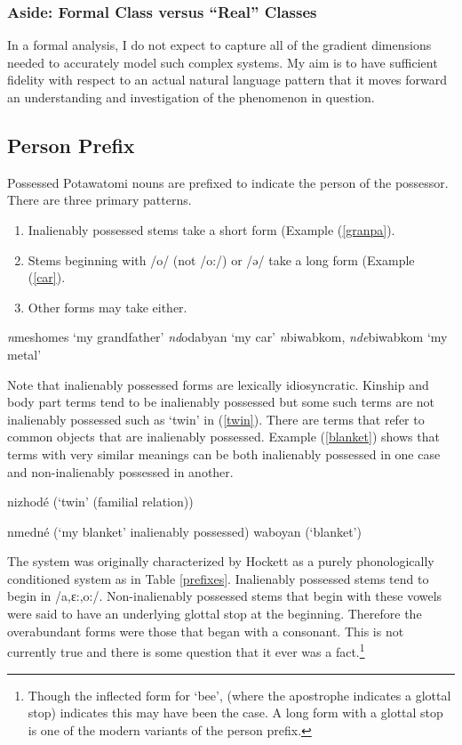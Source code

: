 \subsubsection{Aside: Formal Class versus ``Real'' Classes}

In a formal analysis, I do not expect to capture all of the gradient
dimensions needed to accurately model such complex systems. My aim is
to have sufficient fidelity with respect to an actual natural language
pattern that it moves forward an understanding and investigation of
the phenomenon in question.

\subsection{Person Prefix}

Possessed Potawatomi nouns are prefixed to indicate the person of the
possessor. There are three primary patterns.

\begin{enumerate}
\item Inalienably possessed stems take a short form (Example
  (\ref{granpa}).
\item Stems beginning with /o/ (not /o:/) or /ə/ take a long form
  (Example (\ref{car}).
\item Other forms may take either.
\end{enumerate}

\pex
\a\label{granpa} {\it n}meshomes `my grandfather'
\a\label{car} {\it nd}odabyan `my car'
\a\label{metal} {\it n}biwabkom, {\it nde}biwabkom `my metal'
\xe

Note that inalienably possessed forms are lexically
idiosyncratic. Kinship and body part terms tend to be inalienably
possessed but some such terms are not inalienably possessed such as
`twin' in (\ref{twin}). There are terms that refer to common objects
that are inalienably possessed. Example (\ref{blanket}) shows that
terms with very similar meanings can be both inalienably possessed in
one case and non-inalienably possessed in another.

\ex\label{twin} nizhodé (`twin' (familial relation))\xe

\pex\label{blanket}
\a\label{blanket1} nmedné (`my blanket' inalienably possessed)
\a\label{blanket2} waboyan (`blanket')
\xe

The system was originally characterized by Hockett as a purely
phonologically conditioned system as in Table
\ref{prefixes}. Inalienably possessed stems tend to begin in
/a,ɛ:,o:/. Non-inalienably possessed stems that begin with these
vowels were said to have an underlying glottal stop at the
beginning. Therefore the overabundant forms were those that began with
a consonant. This is not currently true and there is some question
that it ever was a fact.\footnote{Though the inflected form for `bee',
  (where the apostrophe indicates a glottal stop) indicates this may
  have been the case. A long form with a glottal stop is one of the
  modern variants of the person prefix.}

